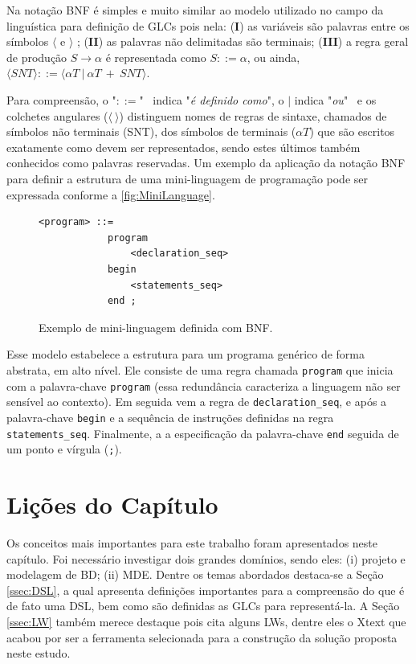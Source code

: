 Na notação \ac{BNF} é simples e muito similar ao modelo utilizado no campo da linguística para definição de \acp{GLC} pois nela: (\textbf{I}) as variáveis são palavras entre os símbolos $\langle$ e $\rangle$ ; (\textbf{II}) as palavras não delimitadas são terminais; (\textbf{III}) a regra geral de produção ${S\to \alpha}$ é representada como ${S ::= \alpha}$, ou ainda, $\langle SNT \rangle ::= \langle \alpha T~|~\alpha T~+~SNT \rangle$. 

Para compreensão, o "\texttt{$::=$}"~ indica "\textit{é definido como}", o \texttt{$|$} indica "\textit{ou}"~ e os colchetes angulares (\texttt{$\langle~\rangle$}) distinguem nomes de regras de sintaxe, chamados de símbolos não terminais (SNT), dos símbolos de terminais (\texttt{$\alpha T$}) que são escritos exatamente como devem ser representados, sendo estes últimos também conhecidos como palavras reservadas. 
Um exemplo da aplicação da notação \ac{BNF} para definir a estrutura de uma mini-linguagem de programação pode ser expressada conforme a \autoref{fig:MiniLanguage}.


\begin{figure}[!htb]
    \centering
    \caption{Exemplo de mini-linguagem definida com BNF.}
    \label{fig:MiniLanguage}
    \begin{scriptsize}
    \begin{lstlisting}[language = BNF , frame = trbl]
<program> ::= 
            program 
                <declaration_seq>
            begin
                <statements_seq>
            end ;
    \end{lstlisting}
    \end{scriptsize}
\end{figure}

Esse modelo estabelece a estrutura para um programa genérico de forma abstrata, em alto nível. 
Ele consiste de uma regra chamada \texttt{program} que inicia com a palavra-chave \texttt{program} (essa redundância caracteriza a linguagem não ser sensível ao contexto).
Em seguida vem a regra de \texttt{declaration\_seq}, e após a palavra-chave \texttt{begin} e a sequência de instruções definidas na regra \texttt{statements\_seq}.
Finalmente, a a especificação da palavra-chave \texttt{end} seguida de um ponto e vírgula (\texttt{;}). 

\section{Lições do Capítulo} \label{sec:LicoesFundamentacaoTeorica}

Os conceitos mais importantes para este trabalho foram apresentados neste capítulo. 
Foi necessário investigar dois grandes domínios, sendo eles: (i) projeto e modelagem de \ac{BD}; (ii) \ac{MDE}.
Dentre os temas abordados destaca-se a Seção \ref{ssec:DSL}, a qual apresenta definições importantes para a compreensão do que é de fato uma \ac{DSL}, bem como são definidas as \acp{GLC} para representá-la. 
A Seção \ref{ssec:LW} também merece destaque pois cita alguns \acp{LW}, dentre eles o Xtext que acabou por ser a ferramenta selecionada para a construção da solução proposta neste estudo.